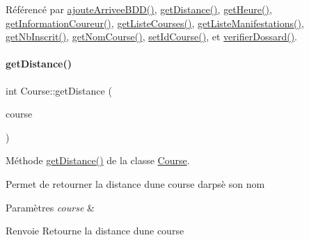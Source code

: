 Référencé par \hyperlink{class_course_ac99042bf8b20e8d3a54e72c8a80f7ee7}{ajoute\+Arrivee\+B\+D\+D()}, \hyperlink{class_course_af20fcd6d6eb2dfbd3b0f12e273f12b27}{get\+Distance()}, \hyperlink{class_course_afc21f8195edd50c9fd266cff0c401b7c}{get\+Heure()}, \hyperlink{class_course_a7ba5d2c9865065e95f49a24fbeec7857}{get\+Information\+Coureur()}, \hyperlink{class_course_ae5e74946d973166ad3000e38600acf20}{get\+Liste\+Courses()}, \hyperlink{class_course_a0d995ef72152208e02eb3b10315dfabb}{get\+Liste\+Manifestations()}, \hyperlink{class_course_ad0ff4153f1e02826d551f478f95ad260}{get\+Nb\+Inscrit()}, \hyperlink{class_course_a7b4485a0b38bc3b908131962b705d880}{get\+Nom\+Course()}, \hyperlink{class_course_a36cf16c971841431947b6fbe2b3f3d27}{set\+Id\+Course()}, et \hyperlink{class_course_a6cb3ede6a11e4813f95be92f4459a3c2}{verifier\+Dossard()}.


\mbox{\label{class_course_af20fcd6d6eb2dfbd3b0f12e273f12b27}} 
\paragraph{\texorpdfstring{get\+Distance()}{getDistance()}}
{\footnotesize\ttfamily int Course\+::get\+Distance (\begin{DoxyParamCaption}\item[{Q\+String}]{course }\end{DoxyParamCaption})}



Méthode \hyperlink{class_course_af20fcd6d6eb2dfbd3b0f12e273f12b27}{get\+Distance()} de la classe \hyperlink{class_course}{Course}. 

Permet de retourner la distance d\textquotesingle{}une course d\textquotesingle{}arpsè son nom 
\begin{DoxyParams}{Paramètres}
{\em course} & \\
\hline
\end{DoxyParams}
\begin{DoxyReturn}{Renvoie}
Retourne la distance d\textquotesingle{}une course 
\end{DoxyReturn}


